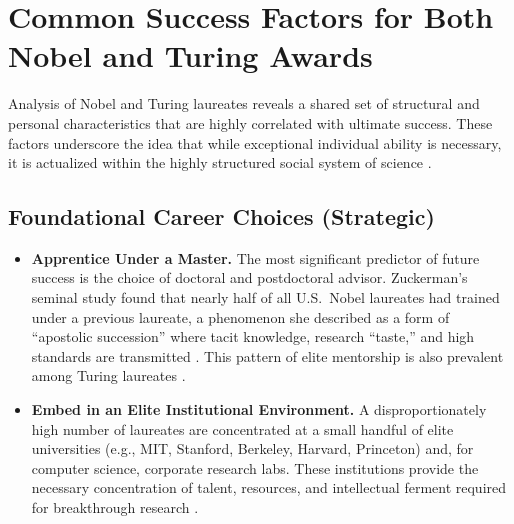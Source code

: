 
\section{Common Success Factors for Both Nobel and Turing Awards}
\label{sec:success_factors}

Analysis of Nobel and Turing laureates reveals a shared set of structural and personal characteristics that are highly correlated with ultimate success.
These factors underscore the idea that while exceptional individual ability is necessary, it is actualized within the highly structured social system of science \citep{zuckerman1977}.

\subsection{Foundational Career Choices (Strategic)}
\begin{itemize}[leftmargin=*]
    \item \textbf{Apprentice Under a Master.} The most significant predictor of future success is the choice of doctoral and postdoctoral advisor.
    Zuckerman's seminal study found that nearly half of all U.S.\ Nobel laureates had trained under a previous laureate, a phenomenon she described as a form of ``apostolic succession'' where tacit knowledge, research ``taste,'' and high standards are transmitted \citep{zuckerman1977}.
    This pattern of elite mentorship is also prevalent among Turing laureates \citep{devanbu2016}.

    \item \textbf{Embed in an Elite Institutional Environment.} A disproportionately high number of laureates are concentrated at a small handful of elite universities (e.g., MIT, Stanford, Berkeley, Harvard, Princeton) and, for computer science, corporate research labs.
    These institutions provide the necessary concentration of talent, resources, and intellectual ferment required for breakthrough research \citep{devanbu2016}.
\end{itemize}

